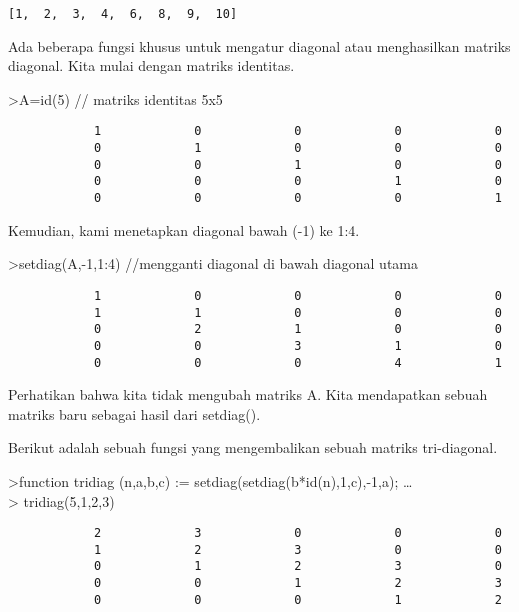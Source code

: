 \documentclass[
]{book}
\begin{document}
\begin{verbatim}
[1,  2,  3,  4,  6,  8,  9,  10]
\end{verbatim}

Ada beberapa fungsi khusus untuk mengatur diagonal atau menghasilkan matriks diagonal. Kita mulai dengan matriks identitas.

\textgreater A=id(5) // matriks identitas 5x5

\begin{verbatim}
            1             0             0             0             0 
            0             1             0             0             0 
            0             0             1             0             0 
            0             0             0             1             0 
            0             0             0             0             1 
\end{verbatim}

Kemudian, kami menetapkan diagonal bawah (-1) ke 1:4.

\textgreater setdiag(A,-1,1:4) //mengganti diagonal di bawah diagonal utama

\begin{verbatim}
            1             0             0             0             0 
            1             1             0             0             0 
            0             2             1             0             0 
            0             0             3             1             0 
            0             0             0             4             1 
\end{verbatim}

Perhatikan bahwa kita tidak mengubah matriks A. Kita mendapatkan sebuah matriks baru sebagai hasil dari setdiag().

Berikut adalah sebuah fungsi yang mengembalikan sebuah matriks tri-diagonal.

\textgreater function tridiag (n,a,b,c) := setdiag(setdiag(b*id(n),1,c),-1,a); \ldots{}\\
\textgreater{} tridiag(5,1,2,3)

\begin{verbatim}
            2             3             0             0             0 
            1             2             3             0             0 
            0             1             2             3             0 
            0             0             1             2             3 
            0             0             0             1             2 
\end{verbatim}
\end{document}
